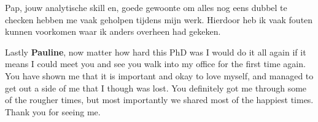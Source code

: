 Pap, jouw analytische skill en, goede gewoonte om alles nog eens dubbel te checken hebben me vaak geholpen tijdens mijn werk.
Hierdoor heb ik vaak fouten kunnen voorkomen waar ik anders overheen had gekeken.

Lastly \textbf{Pauline}, now matter how hard this PhD was I would do it all again if it means I could meet you and see you walk into my office for the first time again.
You have shown me that it is important and okay to love myself, and managed to get out a side of me that I though was lost.
You definitely got me through some of the rougher times, but most importantly we shared most of the happiest times.
Thank you for seeing me.
